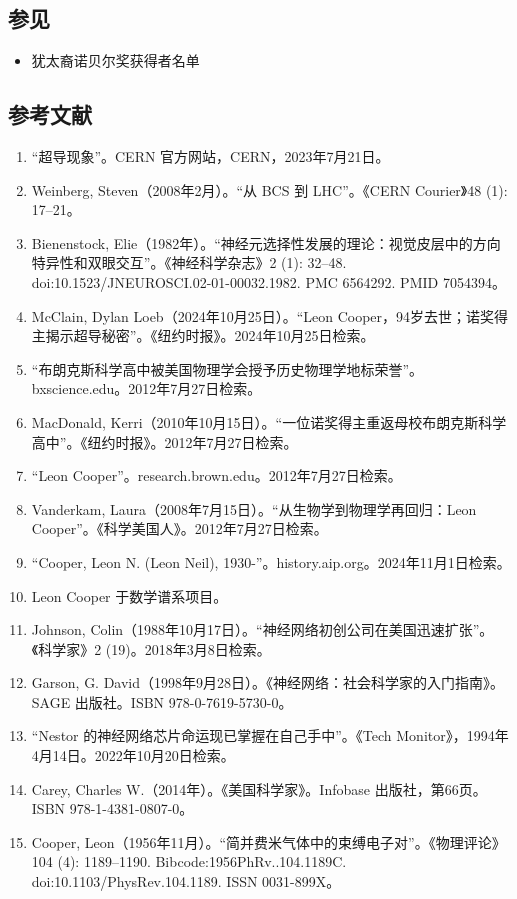 \subsection{参见}
\begin{itemize}
\item 犹太裔诺贝尔奖获得者名单
\end{itemize}
\subsection{参考文献}
\begin{enumerate}
\item “超导现象”。CERN 官方网站，CERN，2023年7月21日。
\item Weinberg, Steven（2008年2月）。“从 BCS 到 LHC”。《CERN Courier》48 (1): 17–21。
\item Bienenstock, Elie（1982年）。“神经元选择性发展的理论：视觉皮层中的方向特异性和双眼交互”。《神经科学杂志》2 (1): 32–48. doi:10.1523/JNEUROSCI.02-01-00032.1982. PMC 6564292. PMID 7054394。
\item McClain, Dylan Loeb（2024年10月25日）。“Leon Cooper，94岁去世；诺奖得主揭示超导秘密”。《纽约时报》。2024年10月25日检索。
\item “布朗克斯科学高中被美国物理学会授予历史物理学地标荣誉”。bxscience.edu。2012年7月27日检索。
\item MacDonald, Kerri（2010年10月15日）。“一位诺奖得主重返母校布朗克斯科学高中”。《纽约时报》。2012年7月27日检索。
\item “Leon Cooper”。research.brown.edu。2012年7月27日检索。
\item Vanderkam, Laura（2008年7月15日）。“从生物学到物理学再回归：Leon Cooper”。《科学美国人》。2012年7月27日检索。
\item “Cooper, Leon N. (Leon Neil), 1930-”。history.aip.org。2024年11月1日检索。
\item Leon Cooper 于数学谱系项目。
\item Johnson, Colin（1988年10月17日）。“神经网络初创公司在美国迅速扩张”。《科学家》2 (19)。2018年3月8日检索。
\item Garson, G. David（1998年9月28日）。《神经网络：社会科学家的入门指南》。SAGE 出版社。ISBN 978-0-7619-5730-0。
\item “Nestor 的神经网络芯片命运现已掌握在自己手中”。《Tech Monitor》，1994年4月14日。2022年10月20日检索。
\item Carey, Charles W.（2014年）。《美国科学家》。Infobase 出版社，第66页。ISBN 978-1-4381-0807-0。
\item Cooper, Leon（1956年11月）。“简并费米气体中的束缚电子对”。《物理评论》104 (4): 1189–1190. Bibcode:1956PhRv..104.1189C. doi:10.1103/PhysRev.104.1189. ISSN 0031-899X。

\end{enumerate}
